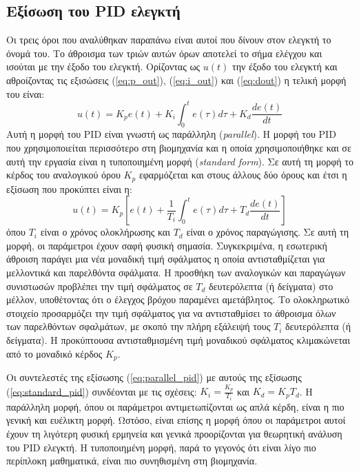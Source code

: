 \subsection{Εξίσωση του PID ελεγκτή}

Οι τρεις όροι που αναλύθηκαν παραπάνω είναι αυτοί που δίνουν στον ελεγκτή το όνομά του. Το άθροισμα των τριών αυτών όρων αποτελεί το σήμα ελέγχου και ισούται με την έξοδο του ελεγκτή. Ορίζοντας ως $u(t)$ την έξοδο του ελεγκτή και αθροίζοντας τις εξισώσεις (\ref{eq:p_out}), (\ref{eq:i_out}) και (\ref{eq:dout}) η τελική μορφή του είναι:
\begin{equation}
u(t)=K_p e(t) + K_i \int_{0}^{t} e(\tau)d\tau + K_d \frac{de(t)}{dt}
\label{eq:parallel_pid}
\end{equation}
Αυτή η μορφή του PID είναι γνωστή ως παράλληλη (\emph{parallel}). Η μορφή του PID που χρησιμοποιείται περισσότερο στη βιομηχανία και η οποία χρησιμοποιήθηκε και σε αυτή την εργασία είναι η τυποποιημένη μορφή (\emph{standard form}). Σε αυτή τη μορφή το κέρδος του αναλογικού όρου $K_p$ εφαρμόζεται και στους άλλους δύο όρους και έτσι η εξίσωση που προκύπτει είναι η:
\begin{equation}
u(t)=K_p \left[ e(t) + \frac{1}{T_i}\int_{0}^{t} e(\tau)d\tau + T_d\frac{de(t)}{dt} \right]
\label{eq:standard_pid}
\end{equation}
όπου $T_i$ είναι ο χρόνος ολοκλήρωσης και $T_d$ είναι ο χρόνος παραγώγισης. Σε αυτή τη μορφή, οι παράμετροι έχουν σαφή φυσική σημασία. Συγκεκριμένα, η εσωτερική άθροιση παράγει μια νέα μοναδική τιμή σφάλματος η οποία αντισταθμίζεται για μελλοντικά και παρελθόντα σφάλματα. Η προσθήκη των αναλογικών και παραγώγων συνιστωσών προβλέπει την τιμή σφάλματος σε $T_d$ δευτερόλεπτα (ή δείγματα) στο μέλλον, υποθέτοντας ότι ο έλεγχος βρόχου παραμένει αμετάβλητος. Το ολοκληρωτικό στοιχείο προσαρμόζει την τιμή σφάλματος για να αντισταθμίσει το άθροισμα όλων των παρελθόντων σφαλμάτων, με σκοπό την πλήρη εξάλειψή τους $T_i$ δευτερόλεπτα (ή δείγματα). Η προκύπτουσα αντισταθμισμένη τιμή μοναδικού σφάλματος κλιμακώνεται από το μοναδικό κέρδος $K_p$.

Οι συντελεστές της εξίσωσης (\ref{eq:parallel_pid}) με αυτούς της εξίσωσης (\ref{eq:standard_pid}) συνδέονται με τις σχέσεις: $\displaystyle K_i=\frac{K_p}{T_i}$ και $\displaystyle K_d=K_p T_d$. Η παράλληλη μορφή, όπου οι παράμετροι αντιμετωπίζονται ως απλά κέρδη, είναι η πιο γενική και ευέλικτη μορφή. Ωστόσο, είναι επίσης η μορφή όπου οι παράμετροι αυτοί έχουν τη λιγότερη φυσική ερμηνεία και γενικά προορίζονται για θεωρητική ανάλυση του PID ελεγκτή. Η τυποποιημένη μορφή, παρά το γεγονός ότι είναι λίγο πιο περίπλοκη μαθηματικά, είναι πιο συνηθισμένη στη βιομηχανία.

